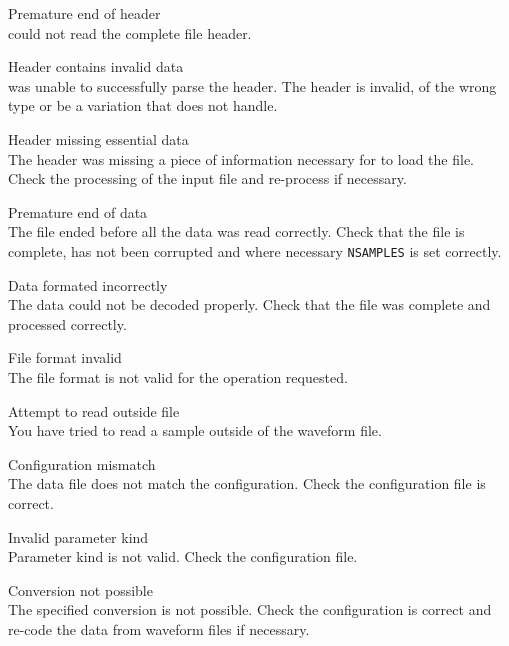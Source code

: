 \begin{itemize}
\begin{itemize}
    Premature end of header\\
         could not read the complete file header.

    Header contains invalid data\\
         was unable to successfully parse the header.  The header
        is invalid, of the wrong type or be a variation that  does
        not handle.

    Header missing essential data\\
        The header was missing a piece of information necessary for 
         to load the file.  Check the processing of the 
        input file and re-process if necessary.

    Premature end of data\\
        The file ended before all the data was read correctly.  Check that the
        file is complete, has not been corrupted and where necessary 
        \texttt{NSAMPLES} is set correctly.

    Data formated incorrectly\\
        The data could not be decoded properly.  Check that the file was 
        complete and processed correctly.

    File format invalid\\
        The file format is not valid for the operation requested.

    Attempt to read outside file\\
        You have tried to read a sample outside of the waveform file.

\end{itemize}


\begin{itemize}
    Configuration mismatch\\
        The data file does not match the configuration.  Check the 
        configuration file is correct.

    Invalid parameter kind\\
        Parameter kind is not valid.  Check the configuration file.

    Conversion not possible\\
        The specified conversion is not possible.  Check the configuration is
        correct and re-code the data from waveform files if necessary.


\end{itemize}
\end{itemize}
